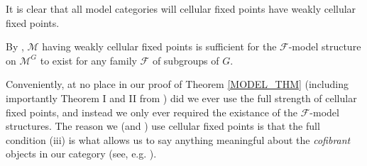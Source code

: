 \documentclass[a4paper,10pt
,draft
]{article}%
\renewcommand{\F}{\mathcal F}
\renewcommand{\1}{\eta}%
\begin{document}
{\begin{definition}
        It is clear that all model categories will cellular fixed points have weakly cellular fixed points.
  \end{definition}

  \begin{remark}
        By \cite[Rem. 2.8]{Ste16}, $\mathcal M$ having weakly cellular fixed points is sufficient for the 
        $\F$-model structure on $\mathcal M^G$ to exist for any family $\F$ of subgroups of $G$.
  \end{remark}

  \begin{remark}
        \label{WEAKCELL_REM}
        Conveniently, at no place in our proof of Theorem \ref{MODEL_THM} (including importantly Theorem I and II from \cite{BP_geo})
        did we ever use the full strength of cellular fixed points,
        and instead we only ever required the existance of the $\F$-model structures.
        The reason we (and \cite{Ste16}) use cellular fixed points is that the full condition (iii) is what allows us to say anything meaningful about the \textit{cofibrant} objects in our category (see, e.g. \cite[Prop. 6.56 and Lemma 6.59]{BP_geo}).
  \end{remark}


}
\end{document}
